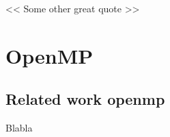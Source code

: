 \begin{savequote}[6cm]
<< Some other great quote  >>
\end{savequote}
\chapter{OpenMP}
\chaptertoc

\section{Related work openmp}\label{sec:intro:titre}


Blabla
